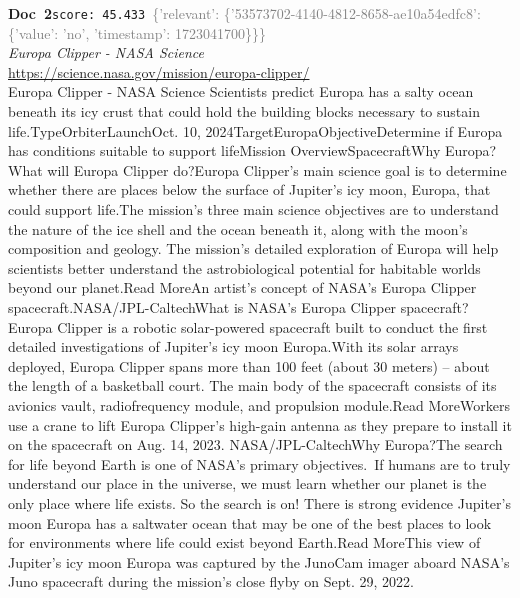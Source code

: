 \documentclass[a4paper,11pt]{article}
\begin{document}
\begin{docenv}
{\footnotesize\textcolor{doccolor}{\textbf{Doc~2}}}\hfill{\tiny\texttt{score:~45.433}}\ {\tiny\textcolor{gray}{\{'relevant': \{'53573702-4140-4812-8658-ae10a54edfc8': \{'value': 'no', 'timestamp': 1723041700\}\}\}}}\\[3pt]
{\small\textit{Europa Clipper - NASA Science}}\\[2pt]
{\tiny\url{https://science.nasa.gov/mission/europa-clipper/}}\\[4pt]
{\footnotesize Europa Clipper - NASA Science
Scientists predict Europa has a salty ocean beneath its icy crust that could hold the building blocks necessary to sustain life.TypeOrbiterLaunchOct. 10, 2024TargetEuropaObjectiveDetermine if Europa has conditions suitable to support lifeMission OverviewSpacecraftWhy Europa?What will Europa Clipper do?Europa Clipper’s main science goal is to determine whether there are places below the surface of Jupiter’s icy moon, Europa, that could support life.The mission’s three main science objectives are to understand the nature of the ice shell and the ocean beneath it, along with the moon’s composition and geology. The mission’s detailed exploration of Europa will help scientists better understand the astrobiological potential for habitable worlds beyond our planet.Read MoreAn artist's concept of NASA’s Europa Clipper spacecraft.NASA/JPL-CaltechWhat is NASA’s Europa Clipper spacecraft?Europa Clipper is a robotic solar-powered spacecraft built to conduct the first detailed investigations of Jupiter's icy moon Europa.With its solar arrays deployed, Europa Clipper spans more than 100 feet (about 30 meters) – about the length of a basketball court. The main body of the spacecraft consists of its avionics vault, radiofrequency module, and propulsion module.Read MoreWorkers use a crane to lift Europa Clipper's high-gain antenna as they prepare to install it on the spacecraft on Aug. 14, 2023. NASA/JPL-CaltechWhy Europa?The search for life beyond Earth is one of NASA’s primary objectives. If humans are to truly understand our place in the universe, we must learn whether our planet is the only place where life exists. So the search is on! There is strong evidence Jupiter's moon Europa has a saltwater ocean that may be one of the best places to look for environments where life could exist beyond Earth.Read MoreThis view of Jupiter’s icy moon Europa was captured by the JunoCam imager aboard NASA’s Juno spacecraft during the mission’s close flyby on Sept. 29, 2022.}
\end{docenv}
\end{document}
